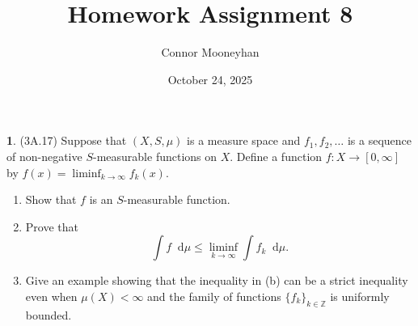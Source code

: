 \documentclass[12pt]{article}
\title{Homework Assignment 8}
\author{Connor Mooneyhan}
\date{October 24, 2025}
\newcommand{\dd}{\mathop{}\!\mathrm{d}}
\theoremstyle{definition}
\newtheorem{ex}{}
\begin{document}
\maketitle

\begin{ex}
	(3A.17)
	Suppose that $(X, S, \mu)$ is a measure space and $f_1, f_2, \dots$ is a sequence of non-negative $S$-measurable functions on $X$.
	Define a function $f : X \to [0, \infty]$ by $f(x) = \liminf_{k \to \infty} f_k(x)$.
	\begin{enumerate}[label=(\alph*)]
		\item Show that $f$ is an $S$-measurable function.
		\item Prove that \begin{equation*}
			      \int f \dd \mu \leq \liminf_{k \to \infty} \int f_k \dd \mu.
		      \end{equation*}
		\item Give an example showing that the inequality in (b) can be a strict inequality even when $\mu(X) < \infty$ and the family of functions $\lbrace f_k \rbrace_{k \in \mathbb{Z}}$ is uniformly bounded.
	\end{enumerate}
\end{ex}
\end{document}

